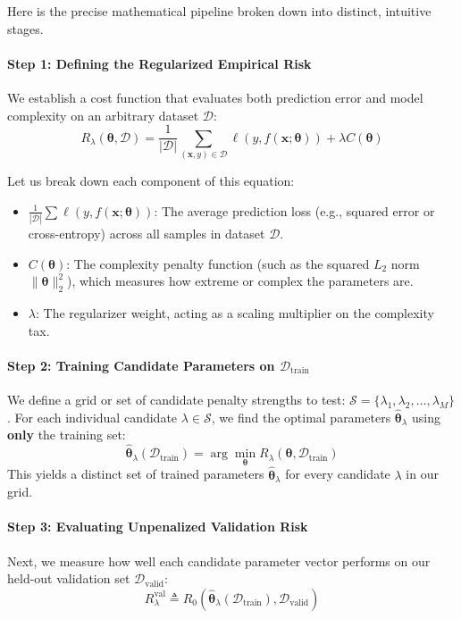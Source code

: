 \documentclass{article}
\begin{document}
Here is the precise mathematical pipeline broken down into distinct, intuitive stages.

\paragraph{Step 1: Defining the Regularized Empirical Risk}
We establish a cost function that evaluates both prediction error and model complexity on an arbitrary dataset $\mathcal{D}$:
\begin{equation}
R_\lambda(\boldsymbol{\theta}, \mathcal{D}) = \frac{1}{|\mathcal{D}|} \sum_{(\mathbf{x},y) \in \mathcal{D}} \ell(y, f(\mathbf{x}; \boldsymbol{\theta})) + \lambda C(\boldsymbol{\theta})
\end{equation}

Let us break down each component of this equation:
\begin{itemize}
    \item $\frac{1}{|\mathcal{D}|} \sum \ell(y, f(\mathbf{x}; \boldsymbol{\theta}))$: The average prediction loss (e.g., squared error or cross-entropy) across all samples in dataset $\mathcal{D}$.
    \item $C(\boldsymbol{\theta})$: The complexity penalty function (such as the squared $L_2$ norm $\|\boldsymbol{\theta}\|_2^2$), which measures how extreme or complex the parameters are.
    \item $\lambda$: The regularizer weight, acting as a scaling multiplier on the complexity tax.
\end{itemize}

\paragraph{Step 2: Training Candidate Parameters on $\mathcal{D}_{\text{train}}$}
We define a grid or set of candidate penalty strengths to test: $\mathcal{S} = \{\lambda_1, \lambda_2, \dots, \lambda_M\}$. For each individual candidate $\lambda \in \mathcal{S}$, we find the optimal parameters $\hat{\boldsymbol{\theta}}_\lambda$ using \textbf{only} the training set:
\begin{equation}
\hat{\boldsymbol{\theta}}_\lambda(\mathcal{D}_{\text{train}}) = \arg\min_{\boldsymbol{\theta}} R_\lambda(\boldsymbol{\theta}, \mathcal{D}_{\text{train}})
\end{equation}
This yields a distinct set of trained parameters $\hat{\boldsymbol{\theta}}_\lambda$ for every candidate $\lambda$ in our grid.

\paragraph{Step 3: Evaluating Unpenalized Validation Risk}
Next, we measure how well each candidate parameter vector performs on our held-out validation set $\mathcal{D}_{\text{valid}}$:
\begin{equation}
R^{\text{val}}_\lambda \triangleq R_0(\hat{\boldsymbol{\theta}}_\lambda(\mathcal{D}_{\text{train}}), \mathcal{D}_{\text{valid}})
\end{equation}
\end{document}
